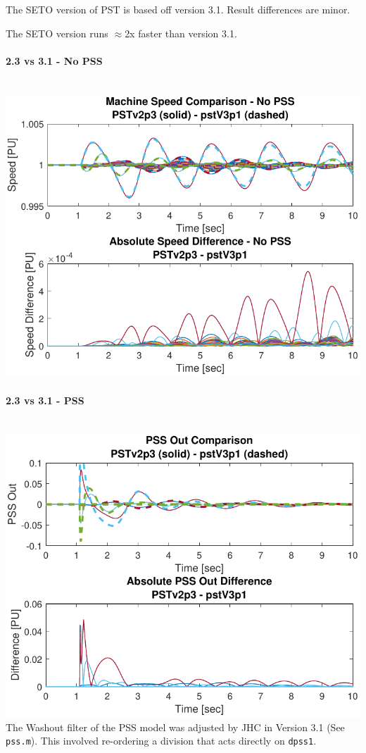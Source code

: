 \documentclass[12pt]{article}
\begin{document}
\begin{landscape}
\begin{multicols}{3}
The SETO version of PST is based off version 3.1.
Result differences are minor.

The SETO version runs $\approx$2x faster than version 3.1.

\vfill\null
\columnbreak
\paragraph{2.3 vs 3.1 - No PSS} \ \\

\includegraphics[width=\linewidth]{23noPSS}

\paragraph{2.3 vs 3.1 - PSS} \ \\
\includegraphics[width=\linewidth]{23PSS}
The Washout filter of the PSS model was adjusted by JHC in Version 3.1 (See \verb|pss.m|).
This involved re-ordering a division that acts directly on \verb|dpss1|.


\end{multicols}
\end{landscape}
\end{document}
